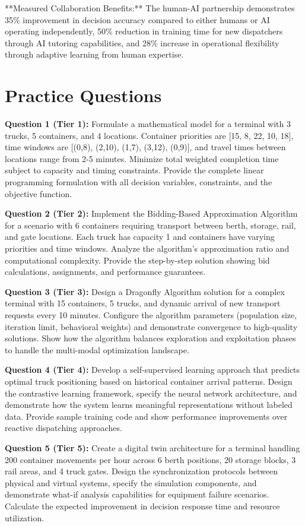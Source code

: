 \documentclass{article}
\begin{document}
**Measured Collaboration Benefits:** The human-AI partnership demonstrates 35\% improvement in decision accuracy compared to either humans or AI operating independently, 50\% reduction in training time for new dispatchers through AI tutoring capabilities, and 28\% increase in operational flexibility through adaptive learning from human expertise.

\section{Practice Questions}

\textbf{Question 1 (Tier 1):} Formulate a mathematical model for a terminal with 3 trucks, 5 containers, and 4 locations. Container priorities are [15, 8, 22, 10, 18], time windows are [(0,8), (2,10), (1,7), (3,12), (0,9)], and travel times between locations range from 2-5 minutes. Minimize total weighted completion time subject to capacity and timing constraints. Provide the complete linear programming formulation with all decision variables, constraints, and the objective function.

\textbf{Question 2 (Tier 2):} Implement the Bidding-Based Approximation Algorithm for a scenario with 6 containers requiring transport between berth, storage, rail, and gate locations. Each truck has capacity 1 and containers have varying priorities and time windows. Analyze the algorithm's approximation ratio and computational complexity. Provide the step-by-step solution showing bid calculations, assignments, and performance guarantees.

\textbf{Question 3 (Tier 3):} Design a Dragonfly Algorithm solution for a complex terminal with 15 containers, 5 trucks, and dynamic arrival of new transport requests every 10 minutes. Configure the algorithm parameters (population size, iteration limit, behavioral weights) and demonstrate convergence to high-quality solutions. Show how the algorithm balances exploration and exploitation phases to handle the multi-modal optimization landscape.

\textbf{Question 4 (Tier 4):} Develop a self-supervised learning approach that predicts optimal truck positioning based on historical container arrival patterns. Design the contrastive learning framework, specify the neural network architecture, and demonstrate how the system learns meaningful representations without labeled data. Provide sample training code and show performance improvements over reactive dispatching approaches.

\textbf{Question 5 (Tier 5):} Create a digital twin architecture for a terminal handling 200 container movements per hour across 6 berth positions, 20 storage blocks, 3 rail areas, and 4 truck gates. Design the synchronization protocols between physical and virtual systems, specify the simulation components, and demonstrate what-if analysis capabilities for equipment failure scenarios. Calculate the expected improvement in decision response time and resource utilization.
\end{document}
